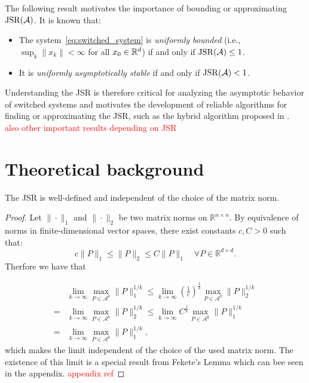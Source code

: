 The following result motivates the importance of bounding or approximating $\operatorname{JSR}(\mathcal{A})$. It is known that:
\begin{samepage}
    \begin{itemize}
        \item The system~\eqref{eq:switched_system} is \emph{uniformly bounded} (i.e., $\sup_k \|x_k\| < \infty$ for all $x_0 \in \mathbb{R}^d$) if and only if $\operatorname{JSR}(\mathcal{A}) \leq 1$.
        \item It is \emph{uniformly asymptotically stable} if and only if $\operatorname{JSR}(\mathcal{A}) < 1$. 
    \end{itemize}
    \citep{blondelSurveyComputationalComplexity2000}
\end{samepage}

Understanding the JSR is therefore critical for analyzing the asymptotic behavior of switched systems and motivates the development of reliable algorithms for finding or approximating the JSR, such as the hybrid algorithm proposed in \citep{mejstrikHybridApproachJoint2024}.
\textcolor{red}{also other important results depending on JSR}

\section{Theoretical background}

\begin{theorem}
    The JSR is well-defined and independent of the choice of the matrix norm.
\end{theorem}

\begin{proof}
Let $\| \cdot \|_1$   and $ \| \cdot \|_2 $ be two matrix norms on $ \mathbb{R}^{n \times n} $. By equivalence of norms in finite-dimensional vector spaces, there exist constants $ c, C > 0 $ such that:
$$
c \|P\|_1 \leq \|P\|_2 \leq C \|P\|_1 \quad \forall P \in \mathbb{R}^{d \times d}
.$$
Therfore we have that

\begin{align*}
& \lim_{k \to \infty} \max_{P \in \mathcal{A}^k} \|P\|_{1}^{1/k} 
\le  \lim_{k \to \infty} {\left(\frac{1}{c}\right)}^{\frac{1}{k}} \max_{P \in \mathcal{A}^k} \|P\|_{2}^{1/k} \\
= & \lim_{k \to \infty} \max_{P \in \mathcal{A}^k} \|P\|_{2}^{1/k} 
\le  \lim_{k \to \infty} {C}^{\frac{1}{k}} \max_{P \in \mathcal{A}^k} \|P\|_{1}^{1/k}\\
= & \lim_{k \to \infty} \max_{P \in \mathcal{A}^k} \|P\|_{1}^{1/k},
\end{align*}
which makes the limit independent of the choice of the used matrix norm. 
The existence of this limit is a special result from Fekete's Lemma which can bee seen in the appendix. \textcolor{red}{appendix ref} 
\end{proof}

